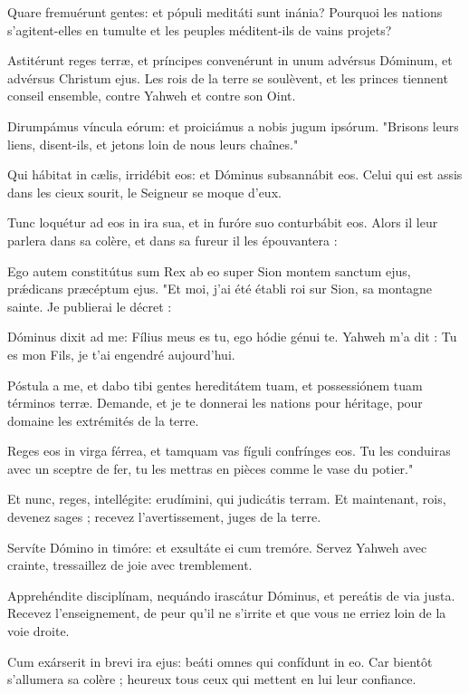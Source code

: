 \begin{paracol}{2}

\LigneParacol{0cm}
{Quare fremuérunt gentes: \GreStar{} et pópuli meditáti sunt inánia?}
{Pourquoi les nations s'agitent-elles en tumulte et les peuples méditent-ils de vains projets? }

\LigneParacol{0.2cm}
{Astitérunt reges terræ, et príncipes convenérunt in unum \GreStar{} advérsus Dóminum, et advérsus Christum ejus.}
{Les rois de la terre se soulèvent, et les princes tiennent conseil ensemble, contre Yahweh et contre son Oint. }

\LigneParacol{0.2cm}
{Dirumpámus víncula eórum: \GreStar{} et proiciámus a nobis jugum ipsórum.}
{"Brisons leurs liens, disent-ils, et jetons loin de nous leurs chaînes." }

\LigneParacol{0.2cm}
{Qui hábitat in cælis, irridébit eos: \GreStar{} et Dóminus subsannábit eos.}
{Celui qui est assis dans les cieux sourit, le Seigneur se moque d'eux. }

\LigneParacol{0.2cm}
{Tunc loquétur ad eos in ira sua, \GreStar{} et in furóre suo conturbábit eos.}
{Alors il leur parlera dans sa colère, et dans sa fureur il les épouvantera : }

\LigneParacol{0.2cm}
{Ego autem constitútus sum Rex ab eo super Sion montem sanctum ejus, \GreStar{} prǽdicans præcéptum ejus.}
{"Et moi, j'ai été établi roi sur Sion, sa montagne sainte. Je publierai le décret :}

\LigneParacol{0.2cm}
{Dóminus dixit ad me: \GreStar{} Fílius meus es tu, ego hódie génui te.}
{Yahweh m'a dit : Tu es mon Fils, je t'ai engendré aujourd'hui. }

\LigneParacol{0.2cm}
{Póstula a me, et dabo tibi gentes hereditátem tuam, \GreStar{} et possessiónem tuam términos terræ.}
{Demande, et je te donnerai les nations pour héritage, pour domaine les extrémités de la terre. }

\LigneParacol{0.2cm}
{Reges eos in virga férrea, \GreStar{} et tamquam vas fíguli confrínges eos.}
{Tu les conduiras avec un sceptre de fer, tu les mettras en pièces comme le vase du potier." }

\LigneParacol{0.2cm}
{Et nunc, reges, intellégite: \GreStar{} erudímini, qui judicátis terram.}
{Et maintenant, rois, devenez sages ; recevez l'avertissement, juges de la terre. }

\LigneParacol{0.2cm}
{Servíte Dómino in timóre: \GreStar{} et exsultáte ei cum tremóre.}
{Servez Yahweh avec crainte, tressaillez de joie avec tremblement. }

\LigneParacol{0.2cm}
{Apprehéndite disciplínam, nequándo irascátur Dóminus, \GreStar{} et pereátis de via justa.}
{Recevez l'enseignement, de peur qu'il ne s'irrite et que vous ne erriez loin de la voie droite.}

\LigneParacol{0.2cm}
{Cum exárserit in brevi ira ejus: \GreStar{} beáti omnes qui confídunt in eo.}
{Car bientôt s'allumera sa colère ; heureux tous ceux qui mettent en lui leur confiance. }

\end{paracol}

